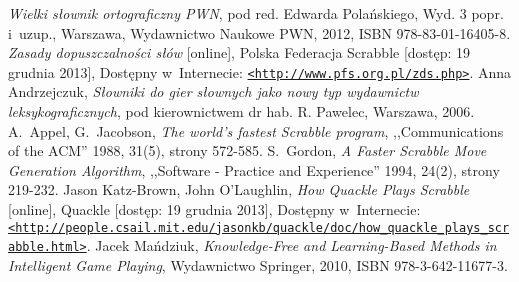 \documentclass[a4paper,twocolumn,12pt]{article}
\begin{document}
\begin{thebibliography}{9}
	\small
		\emph{Wielki słownik ortograficzny PWN}, pod red. Edwarda Polańskiego, Wyd. 3 popr. i~uzup., Warszawa, Wydawnictwo Naukowe PWN, 2012, ISBN 978-83-01-16405-8.
		\emph{Zasady dopuszczalności słów} [online], Polska Federacja Scrabble [dostęp: 19 grudnia 2013], Dostępny w~Internecie: \href{http://www.pfs.org.pl/zds.php}{\nolinkurl{<http://www.pfs.org.pl/zds.php>}}.
		Anna Andrzejczuk, \emph{Słowniki do gier słownych jako nowy typ wydawnictw leksykograficznych}, pod kierownictwem dr hab. R. Pawelec, Warszawa, 2006. 
		A.~Appel, G.~Jacobson, \emph{The world's fastest Scrabble program}, ,,Communications of the ACM'' 1988, 31(5), strony 572-585.
		S.~Gordon, \emph{A Faster Scrabble Move Generation Algorithm}, ,,Software - Practice and Experience'' 1994, 24(2), strony 219-232.
		Jason Katz-Brown, John O'Laughlin, \emph{How Quackle Plays Scrabble} [online], Quackle [dostęp: 19 grudnia 2013], Dostępny w~Internecie: \href{http://people.csail.mit.edu/jasonkb/quackle/doc/how_quackle_plays_scrabble.html}{\nolinkurl{<http://people.csail.mit.edu/jasonkb/quackle/doc/how\_quackle\_plays\_scrabble.html>}}.
		Jacek Mańdziuk, \emph{Knowledge-Free and Learning-Based Methods in Intelligent Game Playing}, Wydawnictwo Springer, 2010, ISBN 978-3-642-11677-3.
\end{thebibliography}
\end{document}

